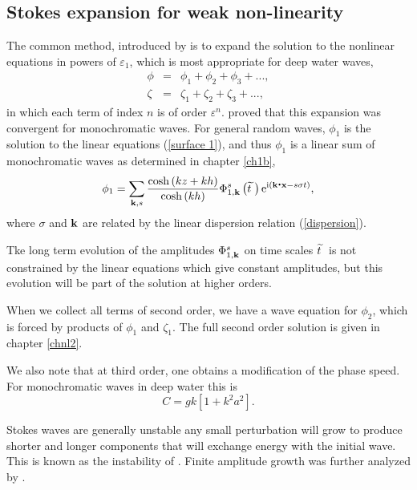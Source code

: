 \subsection{Stokes expansion for weak non-linearity}
The common method, introduced by \cite{Stokes1880} is to expand the solution to the nonlinear equations in 
powers of $\varepsilon_1$, which is most appropriate for deep water waves, 
\begin{eqnarray}
\phi &=& \phi_{1}+  \phi_{2}+ \phi_{3}
    +..., \\
    \zeta &=& \zeta _{1}+ \zeta_{2}+ \zeta_{3}
    + ...,
    \label{power expansion}
\end{eqnarray}
in which each term of index $n$ is of order $\varepsilon^n$.
\cite{Levi-Civita1925} proved that this expansion was convergent for monochromatic waves. For general random waves, 
$\phi _{1}$ is the solution to the linear equations  (\ref{surface 1}), and thus  $\phi_1$ is a 
linear sum of monochromatic waves as determined in chapter \ref{ch1b},
\begin{equation}
    \phi _{1}=\sum_{\kb,s}\frac{\cosh \left( k z+k h\right) }{\cosh \left( kh\right) }
    \Phi _{1,\kb}^{s}\left(\skew4\widetilde{t} \; \right) \mathrm{e}^{\mathrm{i}
    \left(\kb\bcdot{\mathbf x} - s \sigma t\right)},
  \label{phi}
\end{equation}
where $\sigma$ and $\mathbf{k}$ are related by the linear dispersion relation (\ref{dispersion}). 

Tke long term evolution of the amplitudes $\Phi
_{1,\mathbf{k}}^{s}$ on time scales
$\skew4\widetilde{t} \;$ is not constrained by the linear equations which give constant amplitudes, but this evolution 
will be part of the solution at higher orders. 

When we collect all terms of second order, we have a wave equation for  $\phi_2$, which is forced by products of $\phi_1$ and $\zeta_1$. The full 
second order solution is given in chapter \ref{chnl2}. 


We also note that at third order, one obtains a modification of the phase speed. For monochromatic waves in deep water 
this is \citep{Stokes1880}
\begin{equation}
    C=gk \left[1+ k^2 a^2\right].
\end{equation}


Stokes waves are generally unstable any small perturbation will grow to produce shorter and longer components that will exchange 
energy with the initial wave. This is known as the instability of
\cite{Benjamin&Feir1967}. Finite amplitude growth was further analyzed by \cite{Chalikov2007}. 

